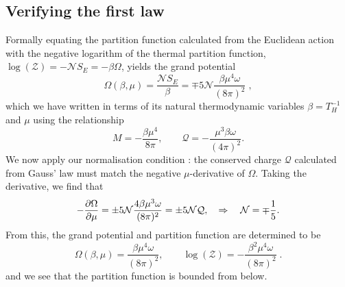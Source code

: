 \subsection{Verifying the first law}

Formally equating the partition function calculated from the Euclidean action with the negative logarithm of the thermal partition function, $\log(\mathcal{Z}) = -\mathcal{N} S_E = -\beta \Omega$,  yields the grand potential
\begin{equation*}
    \Omega(\beta, \mu) = \frac{\mathcal{N} S_E}{\beta} = 
    \mp 5 \mathcal{N}  \frac{\beta  \mu ^4 \omega}{(8 \pi)^2} \;,
\end{equation*}
which we have written in terms of its natural thermodynamic
variables $\beta=T_H^{-1}$ and $\mu$ using the relationship
\begin{equation*}
    M = - \frac{\beta \mu^4}{8 \pi}, \qquad \mathcal{Q} = -\frac{\mu^3 \beta \omega}{(4\pi)^2}.
\end{equation*} 
We now apply our normalisation condition : 
the conserved charge $\mathcal{Q}$ calculated from Gauss' law must match the negative $\mu$-derivative of $\Omega$. Taking the derivative, we find that
\begin{equation*}
	- \frac{\partial \Omega}{\partial \mu} = \pm 5 {\cal N} \frac{4 \beta \mu^3 \omega}{ (8\pi)^2} = \pm 5 {\cal N} \mathcal{Q}, \quad \Rightarrow \quad {\cal N} = \mp \frac{1}{5}.
\end{equation*}
From this, the grand potential and partition function are determined to be
\begin{equation}
\label{eq:grandplanarem} 
\Omega(\beta, \mu) =  \frac{\beta  \mu ^4 \omega}{(8 \pi)^2}, \qquad \log(\mathcal{Z}) = - \frac{\beta^2 \mu^4 \omega}{(8\pi)^2}  \;.
\end{equation}
and we see that the partition function is bounded from below.

